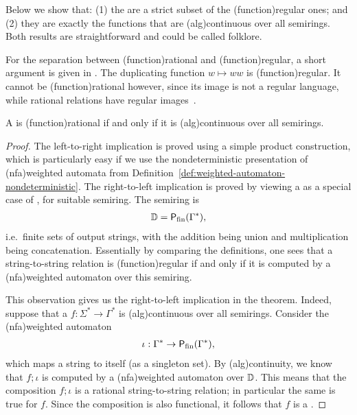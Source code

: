 Below we show that: (1) the  are a
strict subset of the \kl(function){regular} ones; and (2) they are exactly the
functions that are \kl(alg){continuous} over all semirings. Both results are
straightforward and could be called folklore.

\begin{myexample}
    For the separation between \kl(function){rational} and 
    \kl(function){regular}, a short argument is given in 
    \cite[p. 218]{engelfrietMSODefinableString2001}. 
    The duplicating function $w \mapsto ww$ is \kl(function){regular}.
    It cannot be \kl(function){rational} 
    however, since its image is not a regular language, 
    while rational relations have regular images~\cite[Theorem IX.3.1]{Eilenberg74}.
\end{myexample}

\begin{theorem}\label{thm:rational-functions}
  A  is \kl(function){rational} if and only if it is 
  \kl(alg){continuous} over all semirings.
\end{theorem}
\begin{proof}
    The left-to-right implication is proved using a simple product
    construction, which is particularly easy if we use the nondeterministic
    presentation of \kl(nfa){weighted automata} from
    Definition~\ref{def:weighted-automaton-nondeterministic}. The right-to-left
    implication is proved by viewing a  as a
    special case of , for suitable semiring. The semiring is 
    \begin{align*}
    \mathbb D = \mathsf{P}_{\mathrm{fin}}(\Gamma^*),
    \end{align*}
    i.e.~finite sets of output strings, with the addition being union and
    multiplication being concatenation. Essentially by comparing the
    definitions, one sees that a string-to-string relation is \kl(function){regular}
    if and only if it is computed by a \kl(nfa){weighted automaton} over this semiring. 

    This observation gives us the right-to-left implication in the theorem.
    Indeed, suppose that a  $f : \Sigma^* \to
    \Gamma^*$ is \kl(alg){continuous} over all semirings. 
    Consider the \kl(nfa){weighted automaton}
    \begin{align*}
    \iota : \Gamma^* \to \mathsf{P}_{\mathrm{fin}}(\Gamma^*),
    \end{align*}
    which maps a string to itself (as a singleton set). By \kl(alg){continuity}, we know
    that $f; \iota$ is computed by a \kl(nfa){weighted automaton} over $\mathbb D$. This
    means that the composition $f;\iota$ is a rational string-to-string
    relation; in particular the same is true for $f$. Since the composition is
    also functional, it follows that $f$ is a .
\end{proof}


